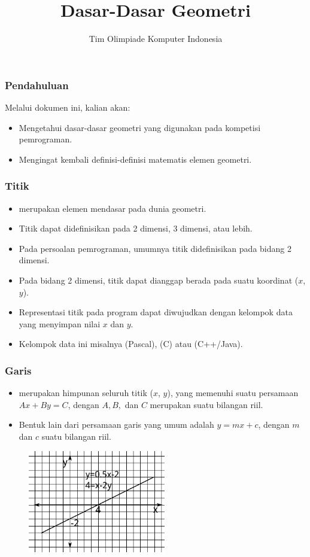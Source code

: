 

\title{Dasar-Dasar Geometri}
\author{Tim Olimpiade Komputer Indonesia}
\date{}



\begin{frame}
\titlepage
\end{frame}

\begin{frame}
\frametitle{Pendahuluan}
Melalui dokumen ini, kalian akan:
\begin{itemize}
  \item Mengetahui dasar-dasar geometri yang digunakan pada kompetisi pemrograman.
  \item Mengingat kembali definisi-definisi matematis elemen geometri.
\end{itemize}
\end{frame}

\begin{frame}
\frametitle{Titik}
\begin{itemize}
  \item {} merupakan elemen mendasar pada dunia geometri.
  \item Titik dapat didefinisikan pada 2 dimensi, 3 dimensi, atau lebih.
  \item Pada persoalan pemrograman, umumnya titik didefinisikan pada bidang 2 dimensi.
  \item Pada bidang 2 dimensi, titik dapat dianggap berada pada suatu koordinat ($x$, $y$).
  \item Representasi titik pada program dapat diwujudkan dengan kelompok data yang menyimpan nilai $x$ dan $y$.
  \item Kelompok data ini misalnya  (Pascal),  (C) atau  (C++/Java).
\end{itemize}
\end{frame}

\begin{frame}
\frametitle{Garis}
\begin{itemize}
  \item {} merupakan himpunan seluruh titik ($x$, $y$), yang memenuhi suatu persamaan $Ax + By = C$, dengan $A, B,$ dan $C$ merupakan suatu bilangan riil.
  \item Bentuk lain dari persamaan garis yang umum adalah $y = mx + c$, dengan $m$ dan $c$ suatu bilangan riil.
\end{itemize}  
\begin{figure}
  \includegraphics[width=6cm]{asset/line.pdf}
\end{figure}
\end{frame}

